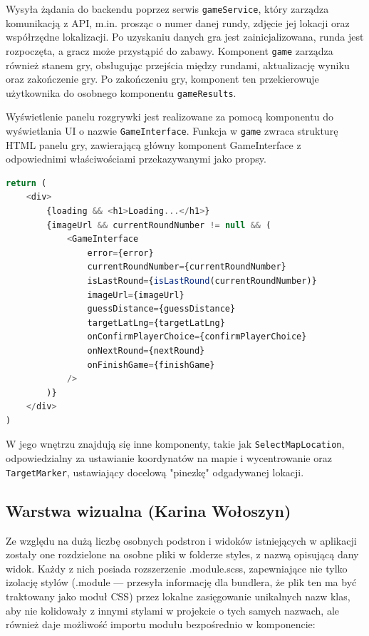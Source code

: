 Wysyła żądania do backendu poprzez serwis \texttt{gameService}, który zarządza komunikacją z API, m.in. prosząc o numer danej rundy, zdjęcie jej lokacji oraz współrzędne lokalizacji. Po uzyskaniu danych gra jest zainicjalizowana, runda jest rozpoczęta, a gracz może przystąpić do zabawy. Komponent \texttt{game} zarządza również stanem gry, obsługując przejścia między rundami, aktualizację wyniku oraz zakończenie gry. Po zakończeniu gry, komponent ten przekierowuje użytkownika do osobnego komponentu \texttt{gameResults}.

Wyświetlenie panelu rozgrywki jest realizowane za pomocą komponentu do wyświetlania UI o nazwie \texttt{GameInterface}. Funkcja w \texttt{game} zwraca strukturę HTML panelu gry, zawierającą główny komponent GameInterface z odpowiednimi właściwościami przekazywanymi jako propsy.

\smallskip
\begin{lstlisting}[language=JavaScript, caption={Proces przekazania danych ze strony rozgrywki do komponentu odpowiadającego za jego UI - GameInterface}, label={lst:front-game-return-interface}]
return (
    <div>
        {loading && <h1>Loading...</h1>}
        {imageUrl && currentRoundNumber != null && (
            <GameInterface
                error={error}
                currentRoundNumber={currentRoundNumber}
                isLastRound={isLastRound(currentRoundNumber)}
                imageUrl={imageUrl}
                guessDistance={guessDistance}
                targetLatLng={targetLatLng}
                onConfirmPlayerChoice={confirmPlayerChoice}
                onNextRound={nextRound}
                onFinishGame={finishGame}
            />
        )}
    </div>
)
\end{lstlisting}

W jego wnętrzu znajdują się inne komponenty, takie jak \texttt{SelectMapLocation}, odpowiedzialny za ustawianie koordynatów na mapie i wycentrowanie oraz \texttt{TargetMarker}, ustawiający docelową "pinezkę" odgadywanej lokacji.

\subsection{Warstwa wizualna (Karina Wołoszyn)}

Ze względu na dużą liczbę osobnych podstron i widoków istniejących w aplikacji zostały one rozdzielone na osobne pliki w folderze styles, z nazwą opisującą dany widok. Każdy z nich posiada rozszerzenie .module.scss, zapewniające nie tylko izolację stylów (.module — przesyła informację dla bundlera, że plik ten ma być traktowany jako moduł CSS) przez lokalne zasięgowanie unikalnych nazw klas, aby nie kolidowały z innymi stylami w projekcie o tych samych nazwach, ale również daje możliwość importu modułu bezpośrednio w komponencie:

